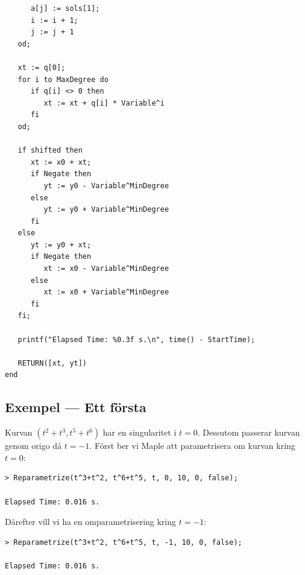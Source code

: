 \begin{verbatim}
      a[j] := sols[1];
      i := i + 1;
      j := j + 1
   od;

   xt := q[0];
   for i to MaxDegree do 
      if q[i] <> 0 then 
         xt := xt + q[i] * Variable^i 
      fi 
   od;

   if shifted then
      xt := x0 + xt;
      if Negate then 
         yt := y0 - Variable^MinDegree
      else 
         yt := y0 + Variable^MinDegree
      fi
   else
      yt := y0 + xt;
      if Negate then 
         xt := x0 - Variable^MinDegree
      else 
         xt := x0 + Variable^MinDegree
      fi
   fi;

   printf("Elapsed Time: %0.3f s.\n", time() - StartTime);

   RETURN([xt, yt])
end
\end{verbatim}

\subsection{Exempel --- Ett första}
\label{ReparametrizeEx1}
Kurvan $(t^2+t^3,t^5+t^6)$ har en singularitet i $t = 0$. Dessutom passerar kurvan genom origo då $t = -1$. Först ber vi Maple att parametrisera om kurvan kring $t = 0$:

\begin{maplegroup}
\begin{verbatim}
> Reparametrize(t^3+t^2, t^6+t^5, t, 0, 10, 0, false);

Elapsed Time: 0.016 s.
\end{verbatim}
\mapleresult
\begin{maplelatex}
\end{maplelatex}
\end{maplegroup}

\vspace{20pt}
Därefter vill vi ha en omparametrisering kring $t = -1$:

\begin{maplegroup}
\begin{verbatim}
> Reparametrize(t^3+t^2, t^6+t^5, t, -1, 10, 0, false);

Elapsed Time: 0.016 s.
\end{verbatim}
\mapleresult
\begin{maplelatex}
\end{maplelatex}
\end{maplegroup}

